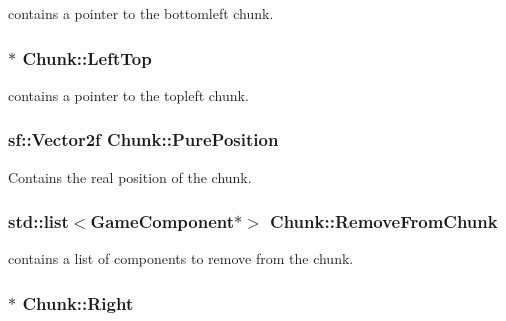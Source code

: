 contains a pointer to the bottomleft chunk. 

\hypertarget{class_chunk_a877d51226eaa97c40c05223987514d59}{
\subsubsection[{Left\-Top}]{$\ast$ Chunk\-::\-Left\-Top\hspace{0.3cm}{\ttfamily [private]}}}\label{class_chunk_a877d51226eaa97c40c05223987514d59}


contains a pointer to the topleft chunk. 

\hypertarget{class_chunk_ace1577872b1189bc7fd88a9b3817ce98}{
\subsubsection[{Pure\-Position}]{\setlength{\rightskip}{0pt plus 5cm}sf\-::\-Vector2f Chunk\-::\-Pure\-Position\hspace{0.3cm}{\ttfamily [private]}}}\label{class_chunk_ace1577872b1189bc7fd88a9b3817ce98}


Contains the real position of the chunk. 

\hypertarget{class_chunk_adf6692fdab4518524e217cc0ef09d282}{
\subsubsection[{Remove\-From\-Chunk}]{\setlength{\rightskip}{0pt plus 5cm}std\-::list$<${\bf Game\-Component}$\ast$$>$ Chunk\-::\-Remove\-From\-Chunk\hspace{0.3cm}{\ttfamily [private]}}}\label{class_chunk_adf6692fdab4518524e217cc0ef09d282}


contains a list of components to remove from the chunk. 

\hypertarget{class_chunk_a0bcf134e2aba0ca49370272c2b3f17a4}{
\subsubsection[{Right}]{$\ast$ Chunk\-::\-Right\hspace{0.3cm}{\ttfamily [private]}}}\label{class_chunk_a0bcf134e2aba0ca49370272c2b3f17a4}


